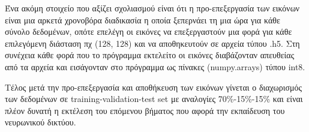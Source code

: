 Ένα ακόμη στοιχείο που αξίζει σχολιασμού είναι ότι η προ-επεξεργασία των εικόνων είναι μια αρκετά χρονοβόρα διαδικασία η οποία ξεπερνάει τη μια ώρα για κάθε σύνολο δεδομένων, οπότε επελέγη οι εικόνες να επεξεργαστούν μια φορά για κάθε επιλεγόμενη διάσταση πχ (128, 128) και να αποθηκευτούν σε αρχεία τύπου .h5. Στη συνέχεια κάθε φορά που το πρόγραμμα εκτελείτο οι εικόνες διαβάζονταν απευθείας από τα αρχεία και εισάγονταν στο πρόγραμμα ως πίνακες (numpy.arrays) τύπου int8.

Τέλος μετά την προ-επεξεργασία και αποθήκευση των εικόνων γίνεται ο διαχωρισμός των δεδομένων σε training-validation-test set με αναλογίες 70\%-15\%-15\% και είναι πλέον δυνατή η εκτέλεση του επόμενου βήματος που αφορά την εκπαίδευση του νευρωνικού δικτύου. 